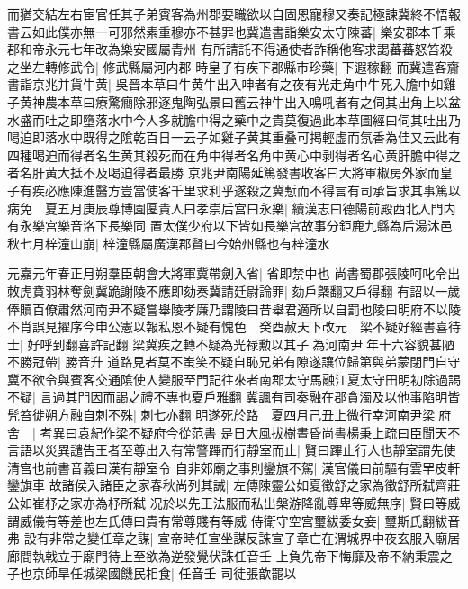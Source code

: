 而猶交結左右宦官任其子弟賓客為州郡要職欲以自固恩寵穆又奏記極諫冀終不悟報書云如此僕亦無一可邪然素重穆亦不甚罪也冀遣書詣樂安太守陳蕃|{
	樂安郡本千乘郡和帝永元七年改為樂安國屬青州}
有所請託不得通使者詐稱他客求謁蕃蕃怒笞殺之坐左轉修武令|{
	修武縣屬河内郡}
時皇子有疾下郡縣市珍藥|{
	下遐稼翻}
而冀遣客齎書詣京兆并貨牛黄|{
	吳晉本草曰牛黄牛出入呻者有之夜有光走角中牛死入膽中如雞子黄神農本草曰療驚癎除邪逐鬼陶弘景曰舊云神牛出入鳴吼者有之伺其出角上以盆水盛而吐之即墮落水中今人多就膽中得之藥中之貴莫復過此本草圖經曰伺其吐出乃喝迫即落水中既得之隂乾百日一云子如雞子黄其重叠可掲輕虚而氛香為佳又云此有四種喝迫而得者名生黄其殺死而在角中得者名角中黄心中剥得者名心黄肝膽中得之者名肝黄大抵不及喝迫得者最勝}
京兆尹南陽延篤發書收客曰大將軍椒房外家而皇子有疾必應陳進醫方豈當使客千里求利乎遂殺之冀慙而不得言有司承旨求其事篤以病免　夏五月庚辰尊博園匽貴人曰孝崇后宫曰永樂|{
	續漢志曰德陽前殿西北入門内有永樂宫樂音洛下長樂同}
置太僕少府以下皆如長樂宫故事分鉅鹿九縣為后湯沐邑　秋七月梓潼山崩|{
	梓潼縣屬廣漢郡賢曰今始州縣也有梓潼水}


元嘉元年春正月朔羣臣朝會大將軍冀帶劍入省|{
	省即禁中也}
尚書蜀郡張陵呵叱令出敇虎賁羽林奪劍冀跪謝陵不應即劾奏冀請廷尉論罪|{
	劾戶槩翻又戶得翻}
有詔以一歲俸贖百僚肅然河南尹不疑嘗舉陵孝廉乃謂陵曰昔舉君適所以自罰也陵曰明府不以陵不肖誤見擢序今申公憲以報私恩不疑有愧色　癸酉赦天下改元　梁不疑好經書喜待士|{
	好呼到翻喜許記翻}
梁冀疾之轉不疑為光禄勲以其子為河南尹年十六容貌甚陋不勝冠帶|{
	勝音升}
道路見者莫不蚩笑不疑自恥兄弟有隙遂讓位歸第與弟蒙閉門自守冀不欲令與賓客交通隂使人變服至門記往來者南郡太守馬融江夏太守田明初除過謁不疑|{
	言過其門因而謁之禮不專也夏戶雅翻}
冀諷有司奏融在郡貪濁及以他事陷明皆髠笞徙朔方融自刺不殊|{
	刺七亦翻}
明遂死於路　夏四月己丑上微行幸河南尹梁府舍　|{
	考異曰袁紀作梁不疑府今從范書}
是日大風拔樹晝昏尚書楊秉上疏曰臣聞天不言語以災異譴告王者至尊出入有常警蹕而行靜室而止|{
	賢曰蹕止行人也靜室謂先使清宫也前書音義曰漢有靜室令}
自非郊廟之事則鑾旗不駕|{
	漢官儀曰前驅有雲䍐皮軒鑾旗車}
故諸侯入諸臣之家春秋尚列其誡|{
	左傳陳靈公如夏徵舒之家為徵舒所弑齊莊公如崔杼之家亦為杼所弑}
况於以先王法服而私出槃游降亂尊卑等威無序|{
	賢曰等威謂威儀有等差也左氏傳曰貴有常尊賤有等威}
侍衛守空宫璽紱委女妾|{
	璽斯氏翻紱音弗}
設有非常之變任章之謀|{
	宣帝時任宣坐謀反誅宣子章亡在渭城界中夜玄服入廟居廊間執戟立于廟門待上至欲為逆發覺伏誅任音壬}
上負先帝下悔靡及帝不納秉震之子也京師旱任城梁國饑民相食|{
	任音壬}
司徒張歆罷以

